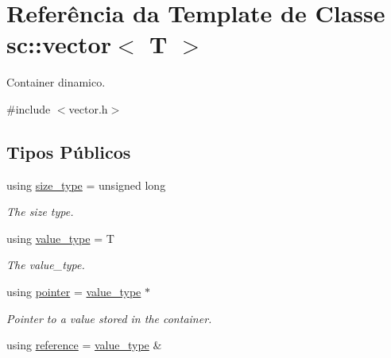 \hypertarget{classsc_1_1vector}{}\section{Referência da Template de Classe sc\+:\+:vector$<$ T $>$}
\label{classsc_1_1vector}


Container dinamico.  




{\ttfamily \#include $<$vector.\+h$>$}

\subsection*{Tipos Públicos}
\begin{DoxyCompactItemize}
\item 
\mbox{\label{classsc_1_1vector_a48bf37ba1a6d0c13504414d86e27c399}} 
using \hyperlink{classsc_1_1vector_a48bf37ba1a6d0c13504414d86e27c399}{size\+\_\+type} = unsigned long
\begin{DoxyCompactList}\small\item\em The size type. \end{DoxyCompactList}\item 
\mbox{\label{classsc_1_1vector_ad37f5bfa688e43c420ed565e4bff6fac}} 
using \hyperlink{classsc_1_1vector_ad37f5bfa688e43c420ed565e4bff6fac}{value\+\_\+type} = T
\begin{DoxyCompactList}\small\item\em The value\+\_\+type. \end{DoxyCompactList}\item 
\mbox{\label{classsc_1_1vector_a0348a6e1e249e051964a2bc94b05527a}} 
using \hyperlink{classsc_1_1vector_a0348a6e1e249e051964a2bc94b05527a}{pointer} = \hyperlink{classsc_1_1vector_ad37f5bfa688e43c420ed565e4bff6fac}{value\+\_\+type} $\ast$
\begin{DoxyCompactList}\small\item\em Pointer to a value stored in the container. \end{DoxyCompactList}\item 
\mbox{\label{classsc_1_1vector_a37394c8a6b82c4a0709737d7982e32b2}} 
using \hyperlink{classsc_1_1vector_a37394c8a6b82c4a0709737d7982e32b2}{reference} = \hyperlink{classsc_1_1vector_ad37f5bfa688e43c420ed565e4bff6fac}{value\+\_\+type} \&

\end{DoxyCompactItemize}
